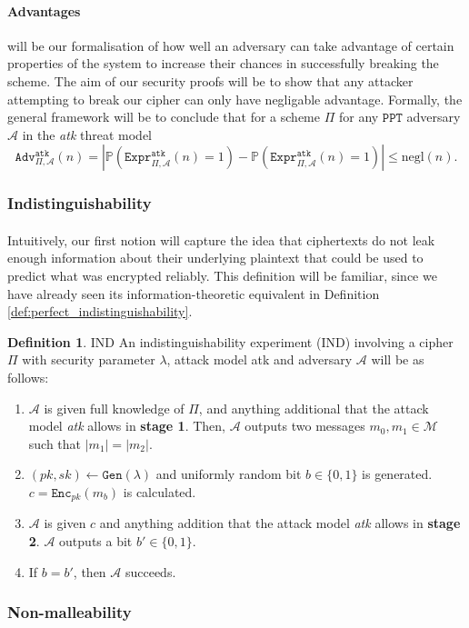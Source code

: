 \documentclass{article}
\theoremstyle{definition}
\newtheorem{definition}{Definition}[section]
\newcommand{\Enc}{\texttt{Enc}}
\newcommand{\Gen}{\texttt{Gen}}
\newcommand{\M}{\mathcal{M}}
\newcommand{\A}{\mathcal{A}}
\newcommand{\Prob}{\mathbb{P}}
\newcommand{\PPT}{\texttt{PPT}}
\newcommand{\negl}{\text{negl}}
\newcommand{\Expr}[2]{\texttt{Expr}^{\texttt{#1}}_{#2}}
\newcommand{\Adv}[2]{\texttt{Adv}^{\texttt{#1}}_{#2}}
\begin{document}
\paragraph{Advantages} will be our formalisation of how well an adversary can
take advantage of certain properties of the system to increase their chances in
successfully breaking the scheme. The aim of our security proofs will be to show
that any attacker attempting to break our cipher can only have negligable
advantage. Formally, the general framework will be to conclude that for a scheme
$\Pi$ for any $\PPT$ adversary $\A$ in the \textit{atk} threat model
\[
  \Adv{atk}{\Pi, \A}(n) = |\Prob(\Expr{atk}{\Pi, \A}(n) = 1) - \Prob(\Expr{atk}{\Pi,
    \A}(n) = 1)| \leq \negl(n).
\]
\subsubsection{Indistinguishability}
\paragraph{} Intuitively, our first notion will capture the idea that
ciphertexts do not leak enough information about their underlying plaintext that
could be used to predict what was encrypted reliably. This definition will be
familiar, since we have already seen its information-theoretic equivalent in
Definition \ref{def:perfect_indistinguishability}.
\begin{definition}{IND}
  An indistinguishability experiment (IND) involving a cipher $\Pi$ with
  security parameter $\lambda$, attack model atk and adversary $\A$ will be as follows:
  \begin{enumerate}
  \item $\A$ is given full knowledge of $\Pi$, and anything additional that the
    attack model \textit{atk} allows in \textbf{stage 1}. Then, $\A$ outputs two messages
    $m_0, m_1 \in \M$ such that $|m_1| = |m_2|$.
  \item $(pk, sk) \leftarrow \Gen(\lambda)$ and uniformly random bit $b \in \{0,
    1\}$ is generated. $c = \Enc_{pk}(m_b)$ is calculated.
  \item $\A$ is given $c$ and anything addition that the attack model
    \textit{atk} allows in \textbf{stage 2}. $\A$ outputs a bit $b' \in \{0,
    1\}$.
  \item If $b = b'$, then $\A$ succeeds.
  \end{enumerate}
\end{definition}
\subsubsection{Non-malleability}
\end{document}
